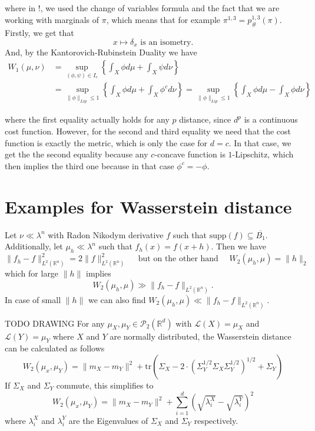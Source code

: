 \documentclass[15pt]{article}
\begin{document}
where in !, we used the change of variables formula and the fact that we are working with marginals of $\pi$, which means that for example $\pi^{1,3} = p^{1,3}_{\#}(\pi)$. \\

Firstly, we get that $$x \mapsto \delta_x \text{ is an isometry.}$$ 
And, by the Kantorovich-Rubinstein Duality we have \begin{align*} W_1(\mu,\nu) &= \sup_{(\phi,\psi) \in I_c} \left\{ \int_X \phi d\mu + \int_X \psi d\nu \right\} \\ &= \sup_{\|\phi\|_{Lip} \leq 1} \left\{\int_X \phi d\mu + \int_X \phi^c d\nu  \right\} 
   = \sup_{\|\phi\|_{Lip} \leq 1} \left\{\int_X \phi d\mu - \int_X \phi d\nu  \right\} \end{align*}

where the first equality actually holds for any $p$ distance, since $d^p$ is a continuous cost function. However, for the second and third equality we need that the cost function is exactly the metric, which is only the case for $d = c$. In that case, we get the the second equality because any $c$-concave function is $1$-Lipschitz, which then implies the third one because in that case $\phi^c = -\phi$.

\section*{Examples for Wasserstein distance}
Let $\nu \ll \lambda^n$ with Radon Nikodym derivative $f$ such that $\text{supp}(f) \subseteq \overline{B_1}$. \\ 
Additionally, let $\mu_h \ll \lambda^n$ such that $f_h(x) = f(x+h)$. 
Then we have $$\|f_h-f\|^2_{L^2(\mathbb{R}^n)} = 2\|f\|_{L^2(\mathbb{R}^n)}^2 \quad \text{ but on the other hand } \quad W_2(\mu_h,\mu) = \|h\|_2$$ which for large $\|h\|$ implies $$W_2(\mu_h,\mu) \gg \|f_h-f\|_{L^2(\mathbb{R}^n)}.$$ 
In case of small $\|h\|$ we can also find $W_2(\mu_h,\mu) \ll \|f_h-f\|_{L^2(\mathbb{R}^n)}$.

\bigbreak
TODO DRAWING
\bigbreak
For any $\mu_X,\mu_Y \in \mathcal{P}_2(\mathbb{R}^d)$ with $\mathcal{L}(X) = \mu_X$ and $\mathcal{L}(Y) = \mu_Y$ where $X$ and $Y$ are normally distributed, 
    the Wasserstein distance can be calculated as follows $$W_2(\mu_x,\mu_Y) = \|m_X-m_Y\|^2 + \text{tr}\left(\Sigma_X-2 \cdot \left(\Sigma_Y^{1/2}\Sigma_X\Sigma_Y^{1/2}\right)^{1/2}+\Sigma_Y\right)$$
    If $\Sigma_X$ and $\Sigma_Y$ commute, this simplifies to $$W_2(\mu_x,\mu_Y) = \|m_X-m_Y\|^2 + \sum_{i = 1}^d \left( \sqrt{\lambda_i^X} - \sqrt{\lambda_i^Y}  \right)^2$$
    where $\lambda_i^X$ and $\lambda_i^Y$ are the Eigenvalues of $\Sigma_X$ and $\Sigma_Y$ respectively. 
\end{document}
